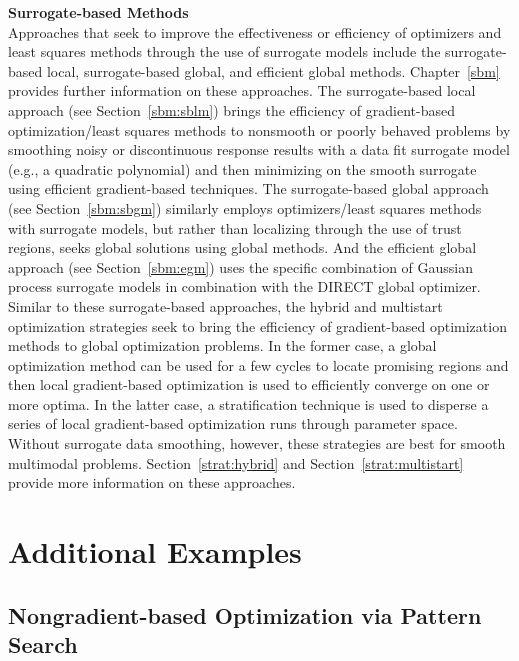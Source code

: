 {\bf Surrogate-based Methods} \\
Approaches that seek to improve the effectiveness or efficiency of
optimizers and least squares methods through the use of surrogate
models include the surrogate-based local, surrogate-based global, and
efficient global methods. Chapter~\ref{sbm} provides further
information on these approaches. The surrogate-based local approach
(see Section~\ref{sbm:sblm}) brings the efficiency of gradient-based
optimization/least squares methods to nonsmooth or poorly behaved
problems by smoothing noisy or discontinuous response results with a
data fit surrogate model (e.g., a quadratic polynomial) and then
minimizing on the smooth surrogate using efficient gradient-based
techniques. The surrogate-based global approach (see
Section~\ref{sbm:sbgm}) similarly employs optimizers/least squares
methods with surrogate models, but rather than localizing through the
use of trust regions, seeks global solutions using global methods.
And the efficient global approach (see Section~\ref{sbm:egm}) uses the
specific combination of Gaussian process surrogate models in
combination with the DIRECT global optimizer. Similar to these
surrogate-based approaches, the hybrid and multistart optimization
strategies seek to bring the efficiency of gradient-based optimization
methods to global optimization problems. In the former case, a global
optimization method can be used for a few cycles to locate promising
regions and then local gradient-based optimization is used to
efficiently converge on one or more optima. In the latter case, a
stratification technique is used to disperse a series of local
gradient-based optimization runs through parameter space. Without
surrogate data smoothing, however, these strategies are best for
smooth multimodal problems. Section~\ref{strat:hybrid} and
Section~\ref{strat:multistart} provide more information on these
approaches.

\section{Additional Examples}\label{opt:examples}

\subsection{Nongradient-based Optimization via Pattern Search}\label{opt:examples:ps}


